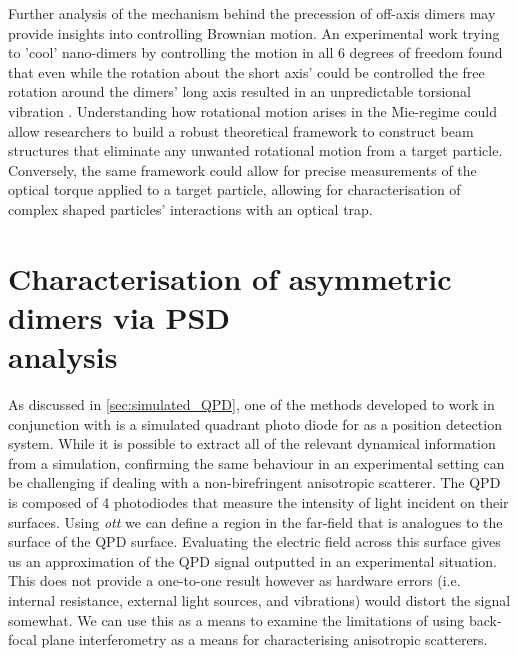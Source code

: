 Further analysis of the mechanism behind the precession of off-axis 
dimers may provide insights into controlling Brownian motion. An 
experimental work trying to 'cool' nano-dimers by controlling the 
motion in all 6 degrees of freedom found that even while the 
rotation about the short axis' could be controlled the free rotation 
around the dimers' long axis resulted in an unpredictable torsional 
vibration \cite{Bang2020}. Understanding how rotational motion 
arises in the Mie-regime could allow researchers to build a robust 
theoretical framework to construct beam structures that eliminate any 
unwanted rotational motion from a target particle. Conversely, the 
same framework could allow for precise measurements of the optical 
torque applied to a target particle, allowing for characterisation 
of complex shaped particles' interactions with an optical trap. 
\section{Characterisation of asymmetric dimers via PSD \\
	analysis}
As discussed in \ref{sec:simulated_QPD}, one of the methods 
developed to work in conjunction with \cite{Vigilante2020} 
is a simulated quadrant photo diode for as a position 
detection system. While it is possible to extract all of 
the relevant dynamical information from a simulation, 
confirming the same behaviour in an experimental setting 
can be challenging if dealing with a non-birefringent 
anisotropic scatterer. The QPD is composed of 4 photodiodes 
that measure the intensity of light incident on their 
surfaces. Using \textit{ott} we can define a region in the 
far-field that is analogues to the surface of the QPD surface. 
Evaluating the electric field across this surface gives us 
an approximation of the QPD signal outputted in an experimental 
situation. This does not provide a one-to-one result however 
as hardware errors (i.e. internal resistance, external light 
sources, and vibrations) would distort the signal somewhat. We 
can use this as a means to examine the limitations of using 
back-focal plane interferometry as a means for characterising 
anisotropic scatterers. 

